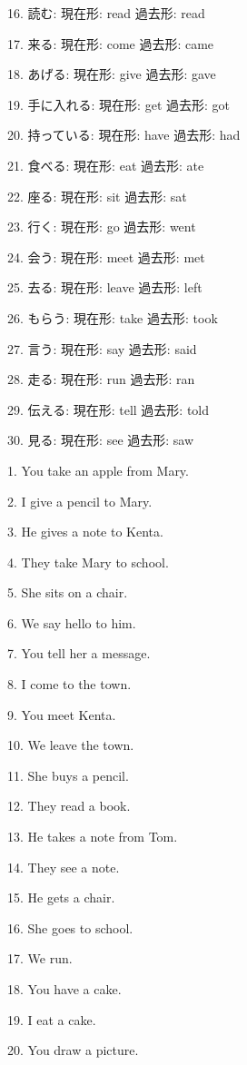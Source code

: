 \documentclass[uplatex,
paper=a4,
fontsize=18pt,
jafontsize=16pt,
number_of_lines=30,
line_length=30zh,
baselineskip=25pt,
]{jlreq}
\begin{document}
16.  読む:   現在形: read   過去形: read

17.  来る:   現在形: come   過去形: came

18.  あげる:   現在形: give   過去形: gave

19.  手に入れる:   現在形: get   過去形: got

20.  持っている:   現在形: have   過去形: had

21.  食べる:   現在形: eat   過去形: ate

22.  座る:   現在形: sit   過去形: sat

23.  行く:   現在形: go   過去形: went

24.  会う:   現在形: meet   過去形: met

25.  去る:   現在形: leave   過去形: left

26.  もらう:   現在形: take   過去形: took

27.  言う:   現在形: say   過去形: said

28.  走る:   現在形: run   過去形: ran

29.  伝える:   現在形: tell   過去形: told

30.  見る:   現在形: see   過去形: saw


\newpage
{}
1.  You take an apple from Mary.

2.  I give a pencil to Mary.

3.  He gives a note to Kenta.

4.  They take Mary to school.

5.  She sits on a chair.

6.  We say hello to him.

7.  You tell her a message.

8.  I come to the town.

9.  You meet Kenta.

10.  We leave the town.

11.  She buys a pencil.

12.  They read a book.

13.  He takes a note from Tom.

14.  They see a note.

15.  He gets a chair.

16.  She goes to school.

17.  We run.

18.  You have a cake.

19.  I eat a cake.

20.  You draw a picture.
\end{document}
